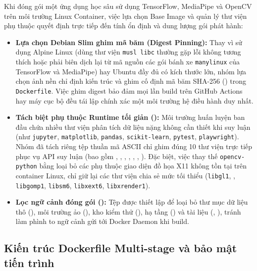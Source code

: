 Khi đóng gói một ứng dụng học sâu sử dụng TensorFlow, MediaPipe và OpenCV trên môi trường Linux Container, việc lựa chọn Base Image và quản lý thư viện phụ thuộc quyết định trực tiếp đến tính ổn định và dung lượng gói phát hành:
\begin{itemize}
    \item \textbf{Lựa chọn Debian Slim ghim mã băm (Digest Pinning):} Thay vì sử dụng Alpine Linux (dùng thư viện \texttt{musl libc} thường gặp lỗi không tương thích hoặc phải biên dịch lại từ mã nguồn các gói bánh xe \texttt{manylinux} của TensorFlow và MediaPipe) hay Ubuntu đầy đủ có kích thước lớn, nhóm lựa chọn ảnh nền \textbf{} chỉ định kiến trúc  và ghim cố định mã băm SHA-256 () trong \texttt{Dockerfile}. Việc ghim digest bảo đảm mọi lần build trên GitHub Actions hay máy cục bộ đều tái lập chính xác một môi trường hệ điều hành duy nhất.
    \item \textbf{Tách biệt phụ thuộc Runtime tối giản ():} Môi trường huấn luyện ban đầu chứa nhiều thư viện phân tích dữ liệu nặng không cần thiết khi suy luận (như \texttt{jupyter}, \texttt{matplotlib}, \texttt{pandas}, \texttt{scikit-learn}, \texttt{pytest}, \texttt{playwright}). Nhóm đã tách riêng tệp  thuần mã ASCII chỉ ghim đúng 10 thư viện trực tiếp phục vụ API suy luận (bao gồm , , , , , , ). Đặc biệt, việc thay thế \texttt{opencv-python} bằng \textbf{} loại bỏ các phụ thuộc giao diện đồ họa X11 không tồn tại trên container Linux, chỉ giữ lại các thư viện chia sẻ mức tối thiểu (\texttt{libgl1}, , \texttt{libgomp1}, \texttt{libsm6}, \texttt{libxext6}, \texttt{libxrender1}).
    \item \textbf{Lọc ngữ cảnh đóng gói ():} Tệp  được thiết lập để loại bỏ thư mục dữ liệu thô (), môi trường ảo (), kho kiểm thử (), hạ tầng () và tài liệu (, ), tránh làm phình to ngữ cảnh gửi tới Docker Daemon khi build.
\end{itemize}

\subsection{Kiến trúc Dockerfile Multi-stage và bảo mật tiến trình}
\label{subsec:cau_hinh_dockerfile}

